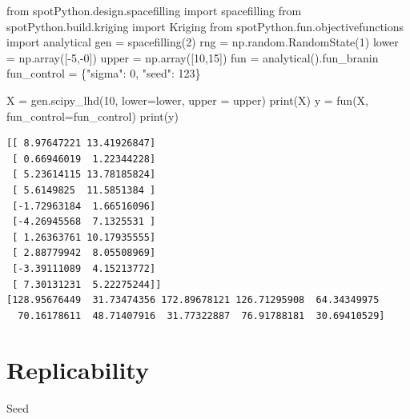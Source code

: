 \documentclass[
  letterpaper,
  DIV=11,
  numbers=noendperiod]{scrreprt}
\newenvironment{Shaded}{\begin{snugshade}}{\end{snugshade}}
\newcommand{\BuiltInTok}[1]{\textcolor[rgb]{0.00,0.23,0.31}{#1}}
\newcommand{\DecValTok}[1]{\textcolor[rgb]{0.68,0.00,0.00}{#1}}
\newcommand{\ImportTok}[1]{\textcolor[rgb]{0.00,0.46,0.62}{#1}}
\newcommand{\NormalTok}[1]{\textcolor[rgb]{0.00,0.23,0.31}{#1}}
\newcommand{\OperatorTok}[1]{\textcolor[rgb]{0.37,0.37,0.37}{#1}}
\newcommand{\StringTok}[1]{\textcolor[rgb]{0.13,0.47,0.30}{#1}}
\begin{document}
\begin{Shaded}
\begin{Highlighting}[]
\ImportTok{from}\NormalTok{ spotPython.design.spacefilling }\ImportTok{import}\NormalTok{ spacefilling}
\ImportTok{from}\NormalTok{ spotPython.build.kriging }\ImportTok{import}\NormalTok{ Kriging}
\ImportTok{from}\NormalTok{ spotPython.fun.objectivefunctions }\ImportTok{import}\NormalTok{ analytical}
\NormalTok{gen }\OperatorTok{=}\NormalTok{ spacefilling(}\DecValTok{2}\NormalTok{)}
\NormalTok{rng }\OperatorTok{=}\NormalTok{ np.random.RandomState(}\DecValTok{1}\NormalTok{)}
\NormalTok{lower }\OperatorTok{=}\NormalTok{ np.array([}\OperatorTok{{-}}\DecValTok{5}\NormalTok{,}\OperatorTok{{-}}\DecValTok{0}\NormalTok{])}
\NormalTok{upper }\OperatorTok{=}\NormalTok{ np.array([}\DecValTok{10}\NormalTok{,}\DecValTok{15}\NormalTok{])}
\NormalTok{fun }\OperatorTok{=}\NormalTok{ analytical().fun\_branin}
\NormalTok{fun\_control }\OperatorTok{=}\NormalTok{ \{}\StringTok{"sigma"}\NormalTok{: }\DecValTok{0}\NormalTok{,}
               \StringTok{"seed"}\NormalTok{: }\DecValTok{123}\NormalTok{\}}

\NormalTok{X }\OperatorTok{=}\NormalTok{ gen.scipy\_lhd(}\DecValTok{10}\NormalTok{, lower}\OperatorTok{=}\NormalTok{lower, upper }\OperatorTok{=}\NormalTok{ upper)}
\BuiltInTok{print}\NormalTok{(X)}
\NormalTok{y }\OperatorTok{=}\NormalTok{ fun(X, fun\_control}\OperatorTok{=}\NormalTok{fun\_control)}
\BuiltInTok{print}\NormalTok{(y)}
\end{Highlighting}
\end{Shaded}

\begin{verbatim}
[[ 8.97647221 13.41926847]
 [ 0.66946019  1.22344228]
 [ 5.23614115 13.78185824]
 [ 5.6149825  11.5851384 ]
 [-1.72963184  1.66516096]
 [-4.26945568  7.1325531 ]
 [ 1.26363761 10.17935555]
 [ 2.88779942  8.05508969]
 [-3.39111089  4.15213772]
 [ 7.30131231  5.22275244]]
[128.95676449  31.73474356 172.89678121 126.71295908  64.34349975
  70.16178611  48.71407916  31.77322887  76.91788181  30.69410529]
\end{verbatim}

\hypertarget{replicability}{%
\section{Replicability}\label{replicability}}

Seed
\end{document}
